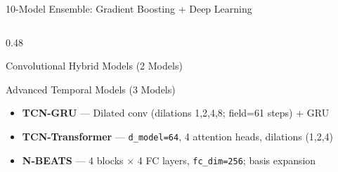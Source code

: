 \documentclass[aspectratio=43,11pt]{beamer}
\begin{document}
\begin{frame}[shrink=12]{10-Model Ensemble: Gradient Boosting + Deep Learning}
\begin{columns}[T]
\begin{column}{0.48\textwidth}
\begin{block}{Convolutional Hybrid Models (2 Models)}
            \end{block}
            \begin{block}{Advanced Temporal Models (3 Models)}
                \footnotesize\setlength{\itemsep}{1pt}
                \begin{itemize}
                    \item \textbf{TCN-GRU} --- Dilated conv (dilations 1,2,4,8; field=61 steps) + GRU
                    \item \textbf{TCN-Transformer} --- \texttt{d\_model=64}, 4 attention heads, dilations (1,2,4)
                    \item \textbf{N-BEATS} --- 4 blocks $\times$ 4 FC layers, \texttt{fc\_dim=256}; basis expansion
                \end{itemize}
            \end{block}
        \end{column}
    \end{columns}
\end{frame}
\end{document}
